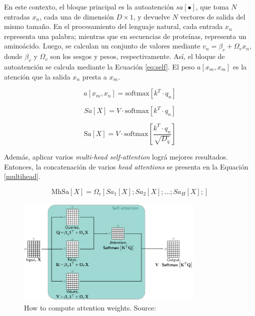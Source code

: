 En este contexto, el bloque principal es la autoatención $sa[\bullet]$, que toma $N$ entradas $x_n$, cada una de dimensión $D \times 1$, y devuelve $N$ vectores de salida del mismo tamaño. En el procesamiento del lenguaje natural, cada entrada $x_n$ representa una palabra; mientras que en secuencias de proteínas, representa un aminoácido. Luego, se calculan un conjunto de valores mediante $v_n = \beta_v + \Omega_vx_n$, donde $\beta_v$ y $\Omega_v$ son los sesgos y pesos, respectivamente. Así, el bloque de autoatención se calcula mediante la Ecuación \ref{eq:self}. El peso $a[x_m, x_m]$ es la atención que la salida $x_n$ presta a $x_m$.


\begin{equation}\label{eq:attention}
	a[x_m, x_n] = \mbox{softmax}[ k^T \cdot q_n ]
\end{equation}

\begin{equation}\label{eq:self-attention}
	Sa[X] = V \cdot \mbox{softmax}[ k^T \cdot q_n ]   
\end{equation}

\begin{equation}\label{eq:scaled-self-attention}
	\mbox{Sa}[X] = V \cdot \mbox{softmax}\left[ \frac{k^T \cdot q_n}{ \sqrt{D_q} }   \right]   
\end{equation}

Además, aplicar varios \textit{multi-head self-attention} lográ mejores resultados. Entonces, la concatenación de varios \textit{head attentions} se presenta en la Equación \ref{multihead}.

\begin{equation}\label{multihead}
	\mbox{MhSa}[X] = \Omega_c[Sa_1[X]; Sa_2[X];...;Sa_H[X];]
\end{equation}

\begin{figure}
	\centering
	\includegraphics[width=0.8\textwidth]{../img/theory/attention_weights_matrix.png}
	\caption{How to compute attention weights. Source: \cite{prince2023understanding}}
	\label{fig:self-attention}
\end{figure}

